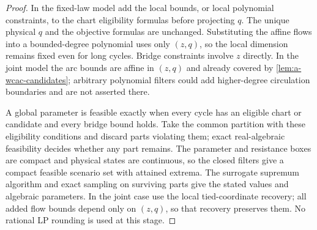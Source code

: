\begin{proof}
In the fixed-law model add the local bounds, or local polynomial
constraints, to the chart eligibility formulas before projecting $q$.
The unique physical $q$ and the objective formulas are unchanged.
Substituting the affine flows into a bounded-degree polynomial uses only
$(z,q)$, so the local dimension remains fixed even for long cycles. Bridge
constraints involve $z$ directly. In the joint model the arc bounds are
affine in $(z,q)$ and already covered by \cref{lem:a-wcac-candidates};
arbitrary polynomial filters could add higher-degree circulation
boundaries and are not asserted there.

A global parameter is feasible exactly when every cycle has an eligible
chart or candidate and every bridge bound holds. Take the common
partition with these eligibility conditions and discard parts violating
them; exact real-algebraic feasibility decides whether any part remains.
The parameter and resistance boxes are compact and physical states are
continuous, so the closed filters give a compact feasible scenario
set with attained extrema. The surrogate supremum algorithm and exact
sampling on surviving parts give the stated values and algebraic
parameters. In the joint case use the local tied-coordinate recovery;
all added flow bounds depend only on $(z,q)$, so that recovery preserves
them. No rational LP rounding is used at this stage.


\end{proof}
